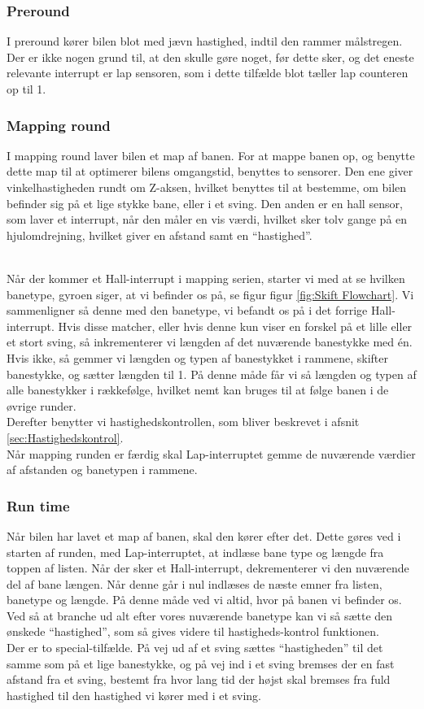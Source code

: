 \subsubsection{Preround}
I preround kører bilen blot med jævn hastighed, indtil den rammer målstregen. Der er ikke nogen grund til, at den skulle gøre noget, før dette sker, og det eneste relevante interrupt er lap sensoren, som i dette tilfælde blot tæller lap counteren op til 1.

\subsubsection{Mapping round}
I mapping round laver bilen et map af banen. For at mappe banen op, og benytte dette map til at optimerer bilens omgangstid, benyttes to sensorer. Den ene giver vinkelhastigheden rundt om Z-aksen, hvilket benyttes til at bestemme, om bilen befinder sig på et lige stykke bane, eller i et sving. Den anden er en hall sensor, som laver et interrupt, når den måler en vis værdi, hvilket sker tolv gange på en hjulomdrejning, hvilket giver en afstand samt en ``hastighed''.
\\\


Når der kommer et Hall-interrupt i mapping serien, starter vi med at se hvilken banetype, gyroen siger, at vi befinder os på, se figur figur \ref{fig:Skift Flowchart}. Vi sammenligner så denne med den banetype, vi befandt os på i det forrige Hall-interrupt. Hvis disse matcher, eller hvis denne kun viser en forskel på et lille eller et stort sving, så inkrementerer vi længden af det nuværende banestykke med én. Hvis ikke, så gemmer vi længden og typen af banestykket i rammene, skifter banestykke, og sætter længden til 1. På denne måde får vi så længden og typen af alle banestykker i rækkefølge, hvilket nemt kan bruges til at følge banen i de øvrige runder.
\\
Derefter benytter vi hastighedskontrollen, som bliver beskrevet i afsnit \ref{sec:Hastighedskontrol}.
\\
Når mapping runden er færdig skal Lap-interruptet gemme de nuværende værdier af afstanden og banetypen i rammene. 

\subsubsection{Run time}

Når bilen har lavet et map af banen, skal den kører efter det. Dette gøres ved i starten af runden, med Lap-interruptet, at indlæse bane type og længde fra toppen af listen. Når der sker et Hall-interrupt, dekrementerer vi den nuværende del af bane længen. Når denne går i nul indlæses de næste emner fra listen, banetype og længde. På denne måde ved vi altid, hvor på banen vi befinder os.
\\
Ved så at branche ud alt efter vores nuværende banetype kan vi så sætte den ønskede ``hastighed'', som så gives videre til hastigheds-kontrol funktionen.
\\
Der er to special-tilfælde. På vej ud af et sving sættes ``hastigheden'' til det samme som på et lige banestykke, og på vej ind i et sving bremses der en fast afstand fra et sving, bestemt fra hvor lang tid der højst skal bremses fra fuld hastighed til den hastighed vi kører med i et sving.
